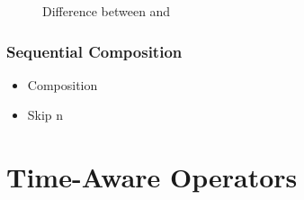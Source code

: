 \documentclass[aspectratio=169,10pt]{beamer}
\begin{document}
\begin{frame}[fragile]
\begin{figure}[!t]
    \caption{Difference between  and }
    \label{fig:diff_hist_op_multi_hist_op}
\end{figure}
\end{frame}

\begin{frame}
  \frametitle{Sequential Composition}
  \begin{itemize}
    \item Composition
    \item Skip n
  \end{itemize}
\end{frame}

\section{Time-Aware Operators}
\end{document}
